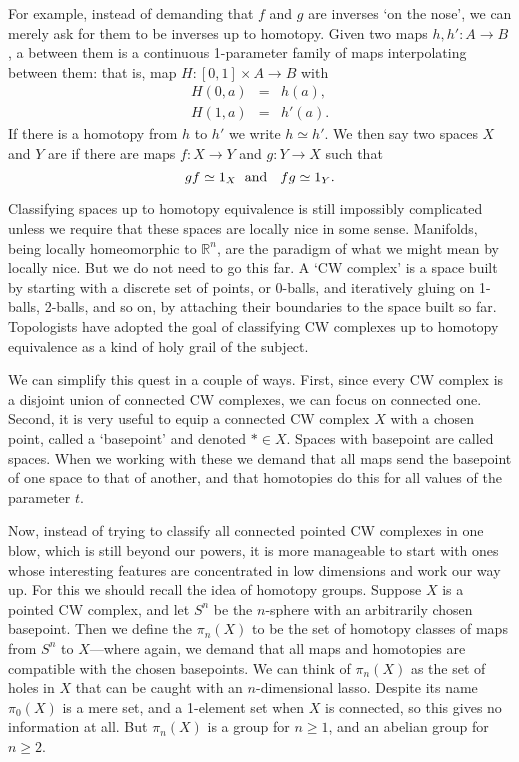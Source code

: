 \documentclass[reqno]{amsart}
\newcommand{\maps}{\colon}    %
\newcommand{\R}{{\mathbb R}}  %
\newcommand{\define}[1]{\textbf{\boldmath{#1}}}
\theoremstyle{definition}
\begin{document}
For example, instead of demanding that $f$ and $g$ are inverses `on the nose', we can merely ask for them to be inverses up to
homotopy.   Given two maps $h, h' \maps A \to B$, a \define{homotopy} between them is a continuous 1-parameter family of maps interpolating between them: that is, map $H \maps [0,1] \times A \to B$ with 
\[    \begin{array}{ccl}
H(0,a) &=& h(a),  \\
H(1,a) &=& h'(a) .
\end{array}
\]
If there is a homotopy from $h$ to $h'$ we write $h \simeq h'$.   We then say two spaces $X$ and $Y$ are \define{homotopy equivalent} if there are maps $f \maps X \to Y$ and $g \maps Y \to X$ such that 
\[        gf \simeq 1_X \textrm{\; and \; }  fg \simeq 1_Y. \]  

Classifying spaces up to homotopy equivalence is still impossibly complicated unless we require that these spaces are locally nice in some sense.  Manifolds, being locally homeomorphic to $\R^n$, are the paradigm of what we might mean by locally nice.  But we do not need to go this far.   A `CW complex' is a space built by starting with a discrete set of points, or 0-balls, and iteratively gluing on 1-balls, 2-balls, and so on, by attaching their boundaries to the space built so far.   Topologists have adopted the goal of classifying CW complexes up to homotopy equivalence as a kind of holy grail of the subject.

We can simplify this quest in a couple of ways.  First, since every CW complex is a disjoint union of connected CW complexes, we can focus on connected one.  Second, it is very useful to equip a connected CW complex $X$ with a chosen point, called a `basepoint' and denoted $\ast \in X$.  Spaces with basepoint are called \define{pointed} spaces.  When we working with these we demand that all maps send the basepoint of one space to that of another, and that homotopies do this for all values of the parameter $t$.

Now, instead of trying to classify all connected pointed CW complexes in one blow, which is still beyond our powers, it is more manageable to start with ones whose interesting features are concentrated in low dimensions and work our way up.   For this we should recall the idea of homotopy groups.   Suppose $X$ is a pointed CW complex, and let $S^n$ be the $n$-sphere with an arbitrarily chosen basepoint.  Then we define the \define{$n$th homotopy group} $\pi_n(X)$ to be the set of homotopy classes of maps from $S^n$ to $X$---where again, we demand that all maps and homotopies are compatible with the chosen basepoints.   We can think of $\pi_n(X)$ as the set of holes in $X$ that can be caught with an $n$-dimensional lasso.   Despite its name $\pi_0(X)$ is a mere set, and a 1-element set when $X$ is connected, so this gives no information at all.  But $\pi_n(X)$ is a group for $n \ge 1$, and an abelian group for $n \ge 2$.  
\end{document}
